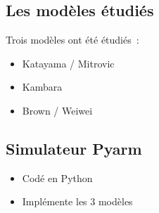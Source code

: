 \documentclass[pdftex,a4paper,11pt]{article}
\begin{document}
\subsection{Les modèles étudiés}
Trois modèles ont été étudiés~:
\begin{itemize}
    \item Katayama / Mitrovic
    \item Kambara
    \item Brown / Weiwei
\end{itemize}

\subsection{Simulateur Pyarm}

\begin{itemize}
    \item Codé en Python
    \item Implémente les 3 modèles
\end{itemize}

\begin{figure}
    \centering
    ~~~
    ~~~
\end{figure}
\end{document}
